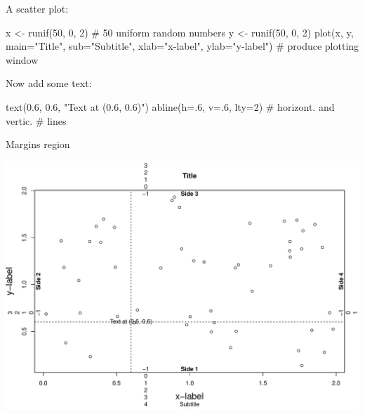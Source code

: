 \documentclass[
  ignorenonframetext,
]{beamer}
\newenvironment{Shaded}{\begin{snugshade}}{\end{snugshade}}
\newcommand{\AttributeTok}[1]{\textcolor[rgb]{0.00,0.34,0.68}{#1}}
\newcommand{\CommentTok}[1]{\textcolor[rgb]{0.54,0.53,0.53}{#1}}
\newcommand{\DecValTok}[1]{\textcolor[rgb]{0.69,0.50,0.00}{#1}}
\newcommand{\FloatTok}[1]{\textcolor[rgb]{0.69,0.50,0.00}{#1}}
\newcommand{\FunctionTok}[1]{\textcolor[rgb]{0.39,0.29,0.61}{#1}}
\newcommand{\NormalTok}[1]{\textcolor[rgb]{0.12,0.11,0.11}{#1}}
\newcommand{\OtherTok}[1]{\textcolor[rgb]{0.00,0.43,0.16}{#1}}
\newcommand{\StringTok}[1]{\textcolor[rgb]{0.75,0.01,0.01}{#1}}
\begin{document}
\begin{frame}[fragile]{A scatter plot:}
\protect\hypertarget{a-scatter-plot}{}
\begin{Shaded}
\begin{Highlighting}[]
\NormalTok{x }\OtherTok{\textless{}{-}} \FunctionTok{runif}\NormalTok{(}\DecValTok{50}\NormalTok{, }\DecValTok{0}\NormalTok{, }\DecValTok{2}\NormalTok{) }\CommentTok{\# 50 uniform random numbers}
\NormalTok{y }\OtherTok{\textless{}{-}} \FunctionTok{runif}\NormalTok{(}\DecValTok{50}\NormalTok{, }\DecValTok{0}\NormalTok{, }\DecValTok{2}\NormalTok{)}
\FunctionTok{plot}\NormalTok{(x, y, }\AttributeTok{main=}\StringTok{"Title"}\NormalTok{, }
     \AttributeTok{sub=}\StringTok{"Subtitle"}\NormalTok{, }\AttributeTok{xlab=}\StringTok{"x{-}label"}\NormalTok{,}
     \AttributeTok{ylab=}\StringTok{"y{-}label"}\NormalTok{) }\CommentTok{\# produce plotting window}
\end{Highlighting}
\end{Shaded}

Now add some text:

\begin{Shaded}
\begin{Highlighting}[]
\FunctionTok{text}\NormalTok{(}\FloatTok{0.6}\NormalTok{, }\FloatTok{0.6}\NormalTok{, }\StringTok{"Text at (0.6, 0.6)"}\NormalTok{)}
\FunctionTok{abline}\NormalTok{(}\AttributeTok{h=}\NormalTok{.}\DecValTok{6}\NormalTok{, }\AttributeTok{v=}\NormalTok{.}\DecValTok{6}\NormalTok{, }\AttributeTok{lty=}\DecValTok{2}\NormalTok{) }\CommentTok{\# horizont. and vertic. }
                          \CommentTok{\# lines}
\end{Highlighting}
\end{Shaded}
\end{frame}

\begin{frame}{Margins region}
\protect\hypertarget{margins-region}{}
\small

\begin{center}\includegraphics[width=1\linewidth]{Practice_files/figure-beamer/unnamed-chunk-33-1} \end{center}
\end{frame}
\end{document}
